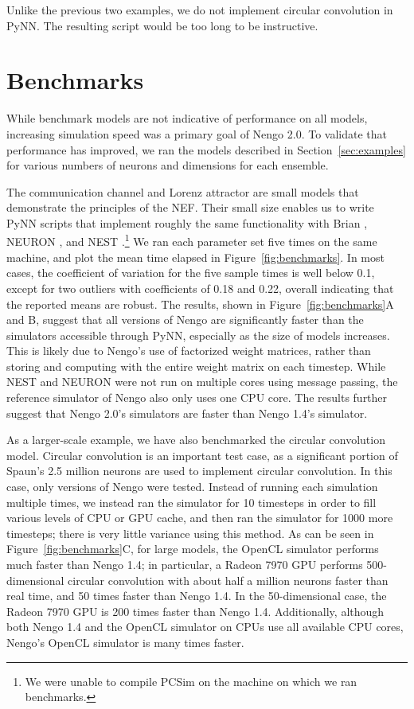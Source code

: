 \documentclass{frontiersSCNS}
\begin{document}
Unlike the previous two examples,
we do not implement
circular convolution in PyNN.
The resulting script would be
too long to be instructive.

\section{Benchmarks} \label{sec:benchmark}

While benchmark models are not indicative
of performance on all models,
increasing simulation speed
was a primary goal of Nengo 2.0.
To validate that performance has improved,
we ran the models described in Section~\ref{sec:examples}
for various numbers of neurons and dimensions
for each ensemble.

The communication channel and Lorenz attractor
are small models that demonstrate
the principles of the NEF.
Their small size enables us to write
PyNN scripts that implement roughly
the same functionality
with Brian \citep{goodman2009}, NEURON \citep{hines2009},
and NEST \citep{eppler2008}.\footnote{We
  were unable to compile PCSim \citep{pecevski2009} on the
  machine on which we ran benchmarks.}
We ran each parameter set five times
on the same machine,
and plot the mean time elapsed
in Figure~\ref{fig:benchmarks}.
In most cases, the coefficient of variation
for the five sample times
is well below 0.1, except for two
outliers with coefficients of 0.18 and 0.22,
overall indicating that the reported means are robust.
The results, shown in Figure~\ref{fig:benchmarks}A and B,
suggest that all versions of Nengo are significantly
faster than the simulators accessible
through PyNN, especially
as the size of models increases.
This is likely due to Nengo's
use of factorized weight matrices,
rather than storing and computing with
the entire weight matrix
on each timestep.
While NEST and NEURON were not
run on multiple cores using message passing,
the reference simulator of Nengo
also only uses one CPU core.
The results further suggest that Nengo 2.0's
simulators are faster than Nengo 1.4's simulator.

As a larger-scale example,
we have also benchmarked
the circular convolution model.
Circular convolution is an important test case,
as a significant portion of Spaun's
2.5 million neurons are used to
implement circular convolution.
In this case, only versions of Nengo were tested.
Instead of running each simulation multiple times,
we instead ran the simulator for 10 timesteps
in order to fill various levels of CPU or GPU cache,
and then ran the simulator for 1000 more timesteps;
there is very little variance using this method.
As can be seen in Figure~\ref{fig:benchmarks}C,
for large models, the OpenCL simulator
performs much faster than Nengo 1.4;
in particular, a Radeon 7970 GPU performs
500-dimensional circular convolution
with about half a million neurons
faster than real time,
and 50 times faster than Nengo 1.4.
In the 50-dimensional case,
the Radeon 7970 GPU is 200 times faster
than Nengo 1.4.
Additionally, although both Nengo 1.4
and the OpenCL simulator on CPUs
use all available CPU cores,
Nengo's OpenCL simulator is many times faster.
\end{document}
